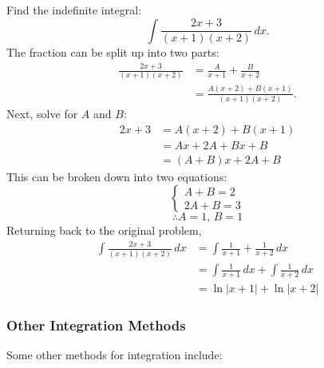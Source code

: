 \documentclass[12pt]{article}
\begin{document}
\noindent Find the indefinite integral:
\[ \int \frac{2x+3}{(x+1)(x+2)} \, dx. \]
The fraction can be split up into two parts:
\begin{align*}
    \frac{2x+3}{(x+1)(x+2)} & = \frac{A}{x+1} + \frac{B}{x+2}       \\[6pt]
                            & = \frac{A(x+2) + B(x+1)}{(x+1)(x+2)}.
\end{align*}
Next, solve for $A$ and $B$:
\begin{align*}
    2x+3 & = A(x+2) + B(x+1)  \\
         & = Ax + 2A + Bx + B \\
         & = (A+B)x + 2A + B
\end{align*}
This can be broken down into two equations:
\[ \begin{cases}
        A+B = 2 \\
        2A + B = 3
    \end{cases} \]
\[ \therefore A = 1, \, B = 1 \]
Returning back to the original problem,
\begin{align*}
    \int \frac{2x+3}{(x+1)(x+2)} \, dx & = \int \frac{1}{x+1} + \frac{1}{x+2} \, dx            \\[6pt]
                                       & = \int \frac{1}{x+1} \, dx + \int \frac{1}{x+2} \, dx \\
                                       & = \ln|x+1| + \ln|x+2|
\end{align*}

\subsubsection{Other Integration Methods}
\noindent Some other methods for integration include:
\end{document}
